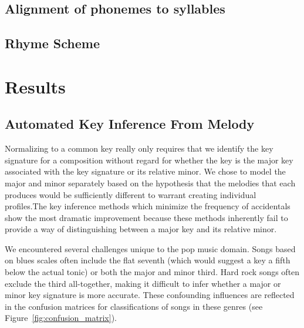 \documentclass[letterpaper]{article}
\begin{document}
\subsection{Alignment of phonemes to syllables}

\subsection{Rhyme Scheme}

\section{Results}
\subsection{Automated Key Inference From Melody}

Normalizing to a common key really only requires that we identify the key signature for a composition without regard for whether the key is the major key associated with the key signature or its relative minor. We chose to model the major and minor separately based on the hypothesis that the melodies that each produces would be sufficiently different to warrant creating individual profiles.The key inference methods which minimize the frequency of accidentals show the most dramatic improvement because these methods inherently fail to provide a way of distinguishing between a major key and its relative minor.

We encountered several challenges unique to the pop music domain. Songs based on blues scales often include the flat seventh (which would suggest a key a fifth below the actual tonic) or both the major and minor third. Hard rock songs often exclude the third all-together, making it difficult to infer whether a major or minor key signature is more accurate. These confounding influences are reflected in the confusion matrices for classifications of songs in these genres (see Figure~\ref{fig:confusion_matrix}).
\end{document}
